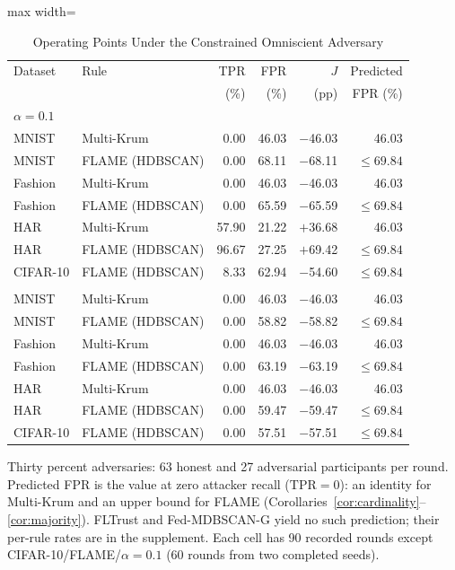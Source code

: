 \begin{table}[!t]
\centering\footnotesize
\setlength{\tabcolsep}{4pt}
\caption{Operating Points Under the Constrained Omniscient Adversary}\label{tab:constrained}
\begin{adjustbox}{max width=\columnwidth}
\begin{tabular}{llrrrr}
\toprule
Dataset & Rule & TPR & FPR & $J$ & Predicted \\
 &  & (\%) & (\%) & (pp) & FPR (\%) \\
\midrule
\multicolumn{6}{l}{\emph{$\alpha=0.1$}} \\
\quad MNIST & Multi-Krum & 0.00 & 46.03 & $-$46.03 & 46.03 \\
\quad MNIST & FLAME (HDBSCAN) & 0.00 & 68.11 & $-$68.11 & $\leq69.84$ \\
\quad Fashion & Multi-Krum & 0.00 & 46.03 & $-$46.03 & 46.03 \\
\quad Fashion & FLAME (HDBSCAN) & 0.00 & 65.59 & $-$65.59 & $\leq69.84$ \\
\quad HAR & Multi-Krum & 57.90 & 21.22 & $+$36.68 & 46.03 \\
\quad HAR & FLAME (HDBSCAN) & 96.67 & 27.25 & $+$69.42 & $\leq69.84$ \\
\quad CIFAR-10 & FLAME (HDBSCAN) & 8.33 & 62.94 & $-$54.60 & $\leq69.84$ \\
\addlinespace[3pt]
\multicolumn{6}{l}{\emph{$\alpha=0.01$}} \\
\quad MNIST & Multi-Krum & 0.00 & 46.03 & $-$46.03 & 46.03 \\
\quad MNIST & FLAME (HDBSCAN) & 0.00 & 58.82 & $-$58.82 & $\leq69.84$ \\
\quad Fashion & Multi-Krum & 0.00 & 46.03 & $-$46.03 & 46.03 \\
\quad Fashion & FLAME (HDBSCAN) & 0.00 & 63.19 & $-$63.19 & $\leq69.84$ \\
\quad HAR & Multi-Krum & 0.00 & 46.03 & $-$46.03 & 46.03 \\
\quad HAR & FLAME (HDBSCAN) & 0.00 & 59.47 & $-$59.47 & $\leq69.84$ \\
\quad CIFAR-10 & FLAME (HDBSCAN) & 0.00 & 57.51 & $-$57.51 & $\leq69.84$ \\
\bottomrule
\end{tabular}
\end{adjustbox}

\par\vspace{3pt}\parbox{\linewidth}{\footnotesize Thirty percent adversaries: 63 honest and 27 adversarial participants per round. Predicted FPR is the value at zero attacker recall ($\mathrm{TPR}=0$): an identity for Multi-Krum and an upper bound for FLAME (Corollaries~\ref{cor:cardinality}--\ref{cor:majority}). FLTrust and Fed-MDBSCAN-G yield no such prediction; their per-rule rates are in the supplement. Each cell has 90 recorded rounds except CIFAR-10/FLAME/$\alpha=0.1$ (60 rounds from two completed seeds).}
\end{table}
